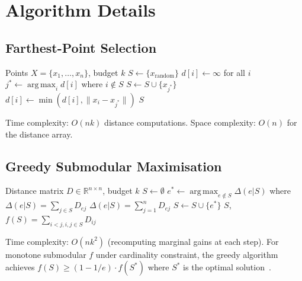 \documentclass[11pt]{article}
\DeclareMathOperator*{\argmax}{arg\,max}
\begin{document}
\appendix

\section{Algorithm Details}
\label{app:algorithms}

\subsection{Farthest-Point Selection}

\begin{algorithm}[H]
\caption{Farthest-Point (Maximin) Selection}
\begin{algorithmic}[1]
\Require Points $X = \{x_1, \ldots, x_n\}$, budget $k$
\State $S \gets \{x_{\text{random}}\}$
\State $d[i] \gets \infty$ for all $i$
  \State $j^* \gets \argmax_i d[i]$ where $i \notin S$
  \State $S \gets S \cup \{x_{j^*}\}$
    \State $d[i] \gets \min(d[i], \|x_i - x_{j^*}\|)$
  \EndFor
\EndFor
\State \Return $S$
\end{algorithmic}
\end{algorithm}

Time complexity: $O(nk)$ distance computations.
Space complexity: $O(n)$ for the distance array.

\subsection{Greedy Submodular Maximisation}

\begin{algorithm}[H]
\caption{Greedy Submodular Maximisation with Sum-Pairwise-Distance}
\begin{algorithmic}[1]
\Require Distance matrix $D \in \mathbb{R}^{n \times n}$, budget $k$
\State $S \gets \emptyset$
  \State $e^* \gets \argmax_{e \notin S} \Delta(e|S)$ where $\Delta(e|S) = \sum_{j \in S} D_{ej}$
   $\Delta(e|S) = \sum_{j=1}^n D_{ej}$ 
  \EndIf
  \State $S \gets S \cup \{e^*\}$
\EndFor
\State \Return $S$, $f(S) = \sum_{i<j, i,j\in S} D_{ij}$
\end{algorithmic}
\end{algorithm}

Time complexity: $O(nk^2)$ (recomputing marginal gains at each step).
For monotone submodular $f$ under cardinality constraint,
the greedy algorithm achieves $f(S) \geq (1 - 1/e) \cdot f(S^*)$
where $S^*$ is the optimal solution~\citep{nemhauser1978analysis}.
\end{document}
